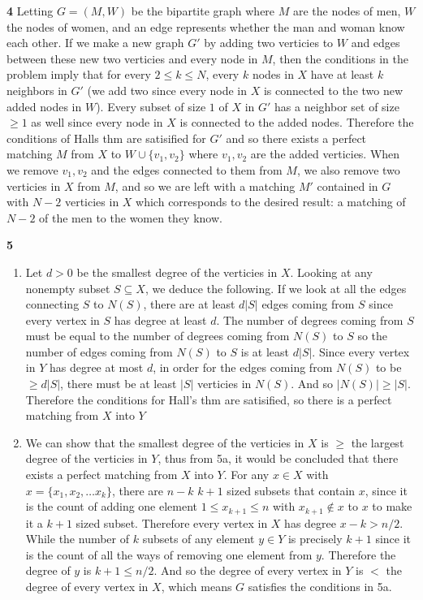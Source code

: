 \documentclass[12pt]{article}
\newenvironment{ques}{\vspace{2 ex}}{\vspace{2 ex}}
\theoremstyle{definition}
\begin{document}
\begin{ques}
	\textbf{4}
	Letting $G = (M,W)$ be the bipartite graph where $M$ are the nodes of
	men, $W$ the nodes of women, and an edge represents whether the man and
	woman know each other. If we make a new graph $G'$ by adding two
	verticies to $W$ and edges between these new two verticies and every node
	in $M$, then the conditions in the problem imply that for every $2 \leq
	k \leq N$, every $k$ nodes in $X$ have at least $k$ neighbors in $G'$
	(we add two since every node in $X$ is connected to the two new added
	nodes in $W$). Every subset of size $1$ of $X$ in $G'$ has a neighbor
	set of size $\geq 1$ as well since every node in $X$ is connected to
	the added nodes. Therefore the conditions of Halls thm are satisified
	for $G'$ and so there exists a perfect matching $M$ from $X$ to $W \cup
	\{v_1, v_2\}$ where $v_1, v_2$ are the added verticies. When we remove
	$v_1, v_2$ and the edges connected to them from $M$, we also remove two
	verticies in $X$ from $M$, and so we are left with a matching $M'$
	contained in $G$ with $N-2$ verticies in $X$ which corresponds to the
	desired result: a matching of $N-2$ of the men
	to the women they know.
\end{ques}

\begin{ques}
	\textbf{5}
	\begin{enumerate}
		\item
		Let $d > 0$ be the smallest degree of the verticies in $X$.
		Looking at any nonempty subset $S \subseteq X$, we deduce the
		following. If we look at all the edges connecting $S$ to
		$N(S)$, there are at least $d|S|$ edges coming from $S$ since
		every vertex in $S$ has degree at least $d$. The number of
		degrees coming from $S$ must be equal to the number of degrees
		coming from $N(S)$ to $S$ so the number of edges coming from $N(S)$ to
		$S$ is at least $d|S|$. Since every vertex in $Y$ has degree at
		most $d$, in order for the edges coming from $N(S)$ to be $\geq
		d|S|$, there must be at least $|S|$ verticies in $N(S)$. And so
		$|N(S)| \geq |S|$. Therefore the conditions for Hall's thm are
		satisified, so there is a perfect matching from $X$ into $Y$
		\item
		We can show that the smallest degree of the verticies in $X$ is
		$\geq$ the largest degree of the verticies in $Y$, thus from
		5a, it would be concluded that there exists a perfect matching
		from $X$ into $Y$. For any $x \in X$ with $x = \{x_1, x_2,
		\dots x_k\}$, there are $n - k$ $k+1$ sized subsets that contain $x$,
		since it is the count of adding one element $1 \leq x_{k+1}
		\leq n$ with $x_{k+1} \notin x$ to $x$ to make it a $k+1$ sized
		subset. Therefore every vertex in $X$ has degree $x - k > n/2$.
		While the number of $k$ subsets of any element $y \in Y$ is
		precisely $k+1$ since it is the count of all the ways of
		removing one element from $y$. Therefore the degree of $y$ is
		$k+1 \leq n/2$. And so the degree of every vertex in $Y$ is $<
		$ the degree of every vertex in $X$, which means $G$ satisfies
		the conditions in 5a.
	\end{enumerate}
\end{ques}
\end{document}
